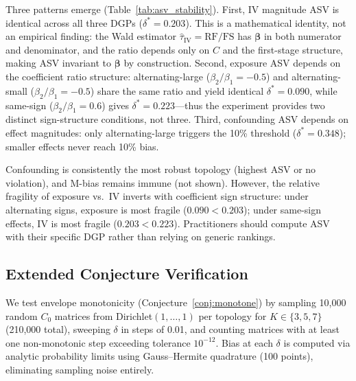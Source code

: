 

Three patterns emerge (Table~\ref{tab:asv_stability}). First, IV magnitude ASV is identical across all three DGPs ($\delta^*{=}0.203$). This is a mathematical identity, not an empirical finding: the Wald estimator $\hat{\tau}_{\text{IV}} = \text{RF}/\text{FS}$ has $\boldsymbol{\beta}$ in both numerator and denominator, and the ratio depends only on $C$ and the first-stage structure, making ASV invariant to $\boldsymbol{\beta}$ by construction. Second, exposure ASV depends on the coefficient ratio structure: alternating-large ($\beta_2/\beta_1 = -0.5$) and alternating-small ($\beta_2/\beta_1 = -0.5$) share the same ratio and yield identical $\delta^*{=}0.090$, while same-sign ($\beta_2/\beta_1 = 0.6$) gives $\delta^*{=}0.223$---thus the experiment provides two distinct sign-structure conditions, not three. Third, confounding ASV depends on effect magnitudes: only alternating-large triggers the 10\% threshold ($\delta^*{=}0.348$); smaller effects never reach 10\% bias.

Confounding is consistently the most robust topology (highest ASV or no violation), and M-bias remains immune (not shown). However, the relative fragility of exposure vs.\ IV inverts with coefficient sign structure: under alternating signs, exposure is most fragile ($0.090 < 0.203$); under same-sign effects, IV is most fragile ($0.203 < 0.223$). Practitioners should compute ASV with their specific DGP rather than relying on generic rankings.

\subsection{Extended Conjecture Verification}
\label{sec:conjecture_verify}

We test envelope monotonicity (Conjecture~\ref{conj:monotone}) by sampling 10{,}000 random $C_0$ matrices from Dirichlet$(1,\dots,1)$ per topology for $K \in \{3,5,7\}$ (210{,}000 total), sweeping $\delta$ in steps of 0.01, and counting matrices with at least one non-monotonic step exceeding tolerance $10^{-12}$. Bias at each $\delta$ is computed via analytic probability limits using Gauss--Hermite quadrature (100 points), eliminating sampling noise entirely.


